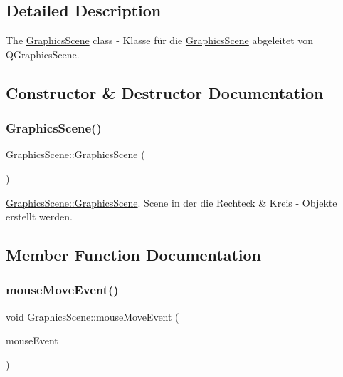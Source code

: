 \subsection{Detailed Description}
The \hyperlink{class_graphics_scene}{Graphics\+Scene} class -\/ Klasse für die \hyperlink{class_graphics_scene}{Graphics\+Scene} abgeleitet von Q\+Graphics\+Scene. 

\subsection{Constructor \& Destructor Documentation}
\mbox{\label{class_graphics_scene_a5a6ac24fb693cce13e3d69c0c38311c9}} 
\subsubsection{\texorpdfstring{Graphics\+Scene()}{GraphicsScene()}}
{\footnotesize\ttfamily Graphics\+Scene\+::\+Graphics\+Scene (\begin{DoxyParamCaption}{ }\end{DoxyParamCaption})}



\hyperlink{class_graphics_scene_a5a6ac24fb693cce13e3d69c0c38311c9}{Graphics\+Scene\+::\+Graphics\+Scene}. Scene in der die Rechteck \& Kreis -\/ Objekte erstellt werden. 



\subsection{Member Function Documentation}
\mbox{\label{class_graphics_scene_a85927a0baa140f37d2c918866c6879f1}} 
\subsubsection{\texorpdfstring{mouse\+Move\+Event()}{mouseMoveEvent()}}
{\footnotesize\ttfamily void Graphics\+Scene\+::mouse\+Move\+Event (\begin{DoxyParamCaption}\item[{Q\+Graphics\+Scene\+Mouse\+Event $\ast$}]{mouse\+Event }\end{DoxyParamCaption})}



